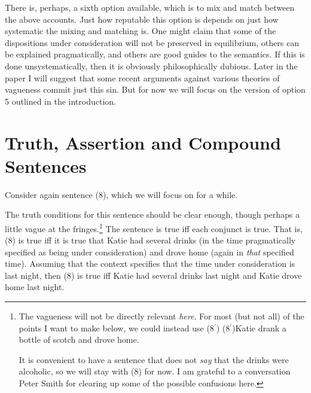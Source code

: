 There is, perhaps, a sixth option available, which is to mix and match between the above accounts. Just how reputable this option is depends on just how systematic the mixing and matching is. One might claim that some of the dispositions under consideration will not be preserved in equilibrium, others can be explained pragmatically, and others are good guides to the semantics. If this is done unsystematically, then it is obviously philosophically dubious. Later in the paper I will suggest that some recent arguments against various theories of vagueness commit just this sin. But for now we will focus on the version of option 5 outlined in the introduction.

\section{Truth, Assertion and Compound Sentences}

Consider again sentence (8), which we will focus on for a while.


\noindent The truth conditions for this sentence should be clear enough, though perhaps a little vague at the fringes.\footnote{The vagueness will not be directly relevant \textit{here}. For most (but not all) of the points I want to make below, we could instead use (8\(^\prime\))\newline
(8\(^\prime\))Katie drank a bottle of scotch and drove home.\par It is convenient to have a sentence that does not \textit{say} that the drinks were alcoholic, so we will stay with (8) for now. I am grateful to a conversation Peter Smith for clearing up some of the possible confusions here.} The sentence is true iff each conjunct is true. That is, (8) is true iff it is true that Katie had several drinks (in the time pragmatically specified as being under consideration) and drove home (again in \textit{that} specified time). Assuming that the context specifies that the time under consideration is last night, then (8) is true iff Katie had several drinks last night and Katie drove home last night.


